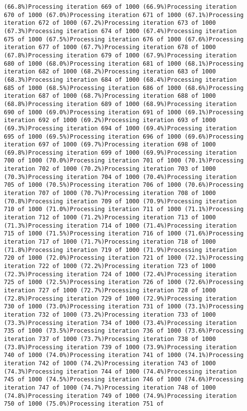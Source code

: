 \documentclass[
]{article}
\begin{document}
\begin{verbatim}
(66.8%)Processing iteration 669 of 1000 (66.9%)Processing iteration 670 of 1000 (67.0%)Processing iteration 671 of 1000 (67.1%)Processing iteration 672 of 1000 (67.2%)Processing iteration 673 of 1000 (67.3%)Processing iteration 674 of 1000 (67.4%)Processing iteration 675 of 1000 (67.5%)Processing iteration 676 of 1000 (67.6%)Processing iteration 677 of 1000 (67.7%)Processing iteration 678 of 1000 (67.8%)Processing iteration 679 of 1000 (67.9%)Processing iteration 680 of 1000 (68.0%)Processing iteration 681 of 1000 (68.1%)Processing iteration 682 of 1000 (68.2%)Processing iteration 683 of 1000 (68.3%)Processing iteration 684 of 1000 (68.4%)Processing iteration 685 of 1000 (68.5%)Processing iteration 686 of 1000 (68.6%)Processing iteration 687 of 1000 (68.7%)Processing iteration 688 of 1000 (68.8%)Processing iteration 689 of 1000 (68.9%)Processing iteration 690 of 1000 (69.0%)Processing iteration 691 of 1000 (69.1%)Processing iteration 692 of 1000 (69.2%)Processing iteration 693 of 1000 (69.3%)Processing iteration 694 of 1000 (69.4%)Processing iteration 695 of 1000 (69.5%)Processing iteration 696 of 1000 (69.6%)Processing iteration 697 of 1000 (69.7%)Processing iteration 698 of 1000 (69.8%)Processing iteration 699 of 1000 (69.9%)Processing iteration 700 of 1000 (70.0%)Processing iteration 701 of 1000 (70.1%)Processing iteration 702 of 1000 (70.2%)Processing iteration 703 of 1000 (70.3%)Processing iteration 704 of 1000 (70.4%)Processing iteration 705 of 1000 (70.5%)Processing iteration 706 of 1000 (70.6%)Processing iteration 707 of 1000 (70.7%)Processing iteration 708 of 1000 (70.8%)Processing iteration 709 of 1000 (70.9%)Processing iteration 710 of 1000 (71.0%)Processing iteration 711 of 1000 (71.1%)Processing iteration 712 of 1000 (71.2%)Processing iteration 713 of 1000 (71.3%)Processing iteration 714 of 1000 (71.4%)Processing iteration 715 of 1000 (71.5%)Processing iteration 716 of 1000 (71.6%)Processing iteration 717 of 1000 (71.7%)Processing iteration 718 of 1000 (71.8%)Processing iteration 719 of 1000 (71.9%)Processing iteration 720 of 1000 (72.0%)Processing iteration 721 of 1000 (72.1%)Processing iteration 722 of 1000 (72.2%)Processing iteration 723 of 1000 (72.3%)Processing iteration 724 of 1000 (72.4%)Processing iteration 725 of 1000 (72.5%)Processing iteration 726 of 1000 (72.6%)Processing iteration 727 of 1000 (72.7%)Processing iteration 728 of 1000 (72.8%)Processing iteration 729 of 1000 (72.9%)Processing iteration 730 of 1000 (73.0%)Processing iteration 731 of 1000 (73.1%)Processing iteration 732 of 1000 (73.2%)Processing iteration 733 of 1000 (73.3%)Processing iteration 734 of 1000 (73.4%)Processing iteration 735 of 1000 (73.5%)Processing iteration 736 of 1000 (73.6%)Processing iteration 737 of 1000 (73.7%)Processing iteration 738 of 1000 (73.8%)Processing iteration 739 of 1000 (73.9%)Processing iteration 740 of 1000 (74.0%)Processing iteration 741 of 1000 (74.1%)Processing iteration 742 of 1000 (74.2%)Processing iteration 743 of 1000 (74.3%)Processing iteration 744 of 1000 (74.4%)Processing iteration 745 of 1000 (74.5%)Processing iteration 746 of 1000 (74.6%)Processing iteration 747 of 1000 (74.7%)Processing iteration 748 of 1000 (74.8%)Processing iteration 749 of 1000 (74.9%)Processing iteration 750 of 1000 (75.0%)Processing iteration 751 of 
\end{verbatim}
\end{document}
